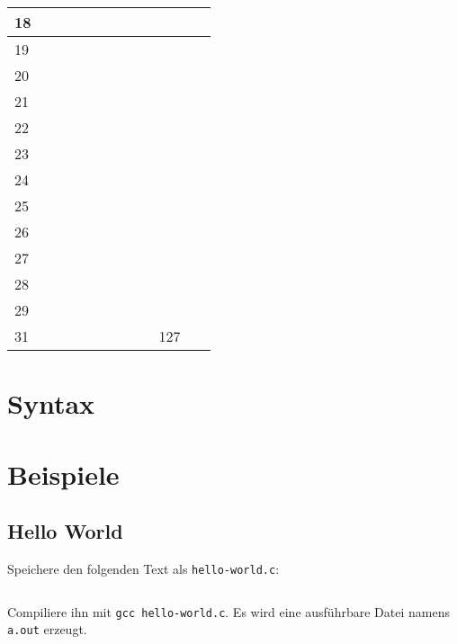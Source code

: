 \begin{table}[htp]
\begin{tabular}{|l|l||l|l||l|l||l|l|}
    18   & ~       & ~    & ~       & ~    & ~       & ~    & ~       \\ \hline
    19   & ~       & ~    & ~       & ~    & ~       & ~    & ~       \\ \hline
    20   & ~       & ~    & ~       & ~    & ~       & ~    & ~       \\ \hline
    21   & ~       & ~    & ~       & ~    & ~       & ~    & ~       \\ \hline
    22   & ~       & ~    & ~       & ~    & ~       & ~    & ~       \\ \hline
    23   & ~       & ~    & ~       & ~    & ~       & ~    & ~       \\ \hline
    24   & ~       & ~    & ~       & ~    & ~       & ~    & ~       \\ \hline
    25   & ~       & ~    & ~       & ~    & ~       & ~    & ~       \\ \hline
    26   & ~       & ~    & ~       & ~    & ~       & ~    & ~       \\ \hline
    27   & ~       & ~    & ~       & ~    & ~       & ~    & ~       \\ \hline
    28   & ~       & ~    & ~       & ~    & ~       & ~    & ~       \\ \hline
    29   & ~       & ~    & ~       & ~    & ~       & ~    & ~       \\ \hline
    31   & ~       & ~    & ~       & ~    & ~       & 127  & ~       \\ \hline\hline
    \end{tabular}
\end{table}

\section{Syntax}
\section{Beispiele}
\subsection{Hello World}
Speichere den folgenden Text als \texttt{hello-world.c}:

\inputminted[linenos, numbersep=5pt, tabsize=4, frame=lines, label=hello-world.c]{c}{scripts/c/hello-world.c}

Compiliere ihn mit \texttt{gcc hello-world.c}. Es wird eine ausführbare
Datei namens \texttt{a.out} erzeugt.


